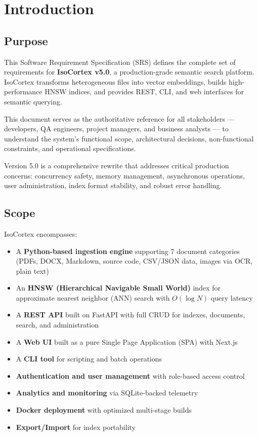 \documentclass[11pt,a4paper]{article}
\begin{document}
\section{Introduction}

\subsection{Purpose}
This Software Requirement Specification (SRS) defines the complete set of requirements for \textbf{IsoCortex v5.0}, a production-grade semantic search platform. IsoCortex transforms heterogeneous files into vector embeddings, builds high-performance HNSW indices, and provides REST, CLI, and web interfaces for semantic querying.

This document serves as the authoritative reference for all stakeholders --- developers, QA engineers, project managers, and business analysts --- to understand the system's functional scope, architectural decisions, non-functional constraints, and operational specifications.

Version 5.0 is a comprehensive rewrite that addresses critical production concerns: concurrency safety, memory management, asynchronous operations, user administration, index format stability, and robust error handling.

\subsection{Scope}
IsoCortex encompasses:

\begin{itemize}
    \item A \textbf{Python-based ingestion engine} supporting 7 document categories (PDFs, DOCX, Markdown, source code, CSV/JSON data, images via OCR, plain text)
    \item An \textbf{HNSW (Hierarchical Navigable Small World)} index for approximate nearest neighbor (ANN) search with $O(\log N)$ query latency
    \item A \textbf{REST API} built on FastAPI with full CRUD for indexes, documents, search, and administration
    \item A \textbf{Web UI} built as a pure Single Page Application (SPA) with Next.js
    \item A \textbf{CLI tool} for scripting and batch operations
    \item \textbf{Authentication and user management} with role-based access control
    \item \textbf{Analytics and monitoring} via SQLite-backed telemetry
    \item \textbf{Docker deployment} with optimized multi-stage builds
    \item \textbf{Export/Import} for index portability
\end{itemize}
\end{document}
